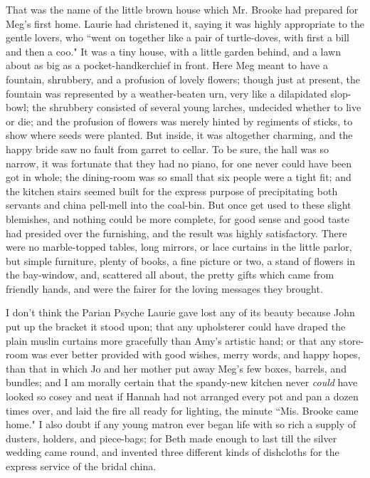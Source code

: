 That was the name of the little brown house which Mr. Brooke had
prepared for Meg's first home. Laurie had christened it,
saying it was highly appropriate to the gentle lovers, who ``went on
together like a pair of turtle-doves, with first a bill and then a coo."
It was a tiny house, with a little garden behind, and a lawn about as
big as a pocket-handkerchief in front. Here Meg meant to have a
fountain, shrubbery, and a profusion of lovely flowers; though just at
present, the fountain was represented by a weather-beaten urn, very like
a dilapidated slop-bowl; the shrubbery consisted of several young
larches, undecided whether to live or die; and the profusion of flowers
was merely hinted by regiments of sticks, to show where seeds were
planted. But inside, it was altogether charming, and the happy bride saw
no fault from garret to cellar. To be sure, the hall was so narrow, it
was fortunate that they had no piano, for one never could have been got
in whole; the dining-room was so small that six people were a tight fit;
and the kitchen stairs seemed built for the express purpose of
precipitating both servants and china pell-mell into the coal-bin. But
once get used to these slight blemishes, and nothing could be more
complete, for good sense and good taste had presided over the
furnishing, and the result was highly satisfactory. There were no
marble-topped tables, long mirrors, or lace curtains in the little
parlor, but simple furniture, plenty of books, a fine picture or two, a
stand of flowers in the bay-window, and, scattered all about, the pretty
gifts which came from friendly hands, and were the fairer for the loving
messages they brought.

I don't think the Parian Psyche Laurie gave lost any of
its beauty because John put up the bracket it stood upon; that any
upholsterer could have draped the plain muslin curtains more gracefully
than Amy's artistic hand; or that any store-room was
ever better provided with good wishes, merry words, and happy hopes,
than that in which Jo and her mother put away Meg's few
boxes, barrels, and bundles; and I am morally certain that the
spandy-new kitchen never \emph{could} have looked so cosey and neat if
Hannah had not arranged every pot and pan a dozen times over, and laid
the fire all ready for lighting, the minute ``Mis. Brooke came home." I
also doubt if any young matron ever began life with so rich a supply of
dusters, holders, and piece-bags; for Beth made enough to last till the
silver wedding came round, and invented three different kinds of
dishcloths for the express service of the bridal china.

